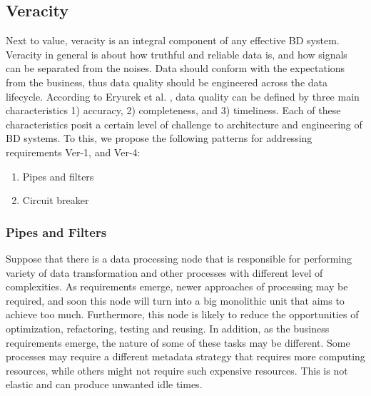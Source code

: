 \documentclass{bmcart}
\begin{document}


\subsection{Veracity}

Next to value, veracity is an integral component of any effective BD system. Veracity in general is about how truthful and reliable data is, and how signals can be separated from the noises. Data should conform with the expectations from the business, thus data quality should be engineered across the data lifecycle. According to Eryurek et al. \cite{eryurek2021data}, data quality can be defined by three main characteristics 1) accuracy, 2) completeness, and 3) timeliness. Each of these characteristics posit a certain level of challenge to architecture and engineering of BD systems. To this, we propose the following patterns for addressing requirements Ver-1, and Ver-4:

\begin{enumerate}
  \item Pipes and filters 
  \item Circuit breaker
\end{enumerate}


\subsubsection{Pipes and Filters}

Suppose that there is a data processing node that is responsible for performing variety of data transformation and other processes with different level of complexities. As requirements emerge, newer approaches of processing may be required, and soon this node will turn into a big monolithic unit that aims to achieve too much. Furthermore, this node is likely to reduce the opportunities of optimization, refactoring, testing and reusing. In addition, as the business requirements emerge, the nature of some of these tasks may be different. Some processes may require a different metadata strategy that requires more computing resources, while others might not require such expensive resources. This is not elastic and can produce unwanted idle times. 
\end{document}
